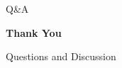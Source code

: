 \setsource{}
\begin{frame}[c,label=qa]{Q\&A}
\centering
{\LARGE\bfseries{} Thank You\par}
\vspace{0.7cm}
{\large Questions and Discussion\par}
\end{frame}

